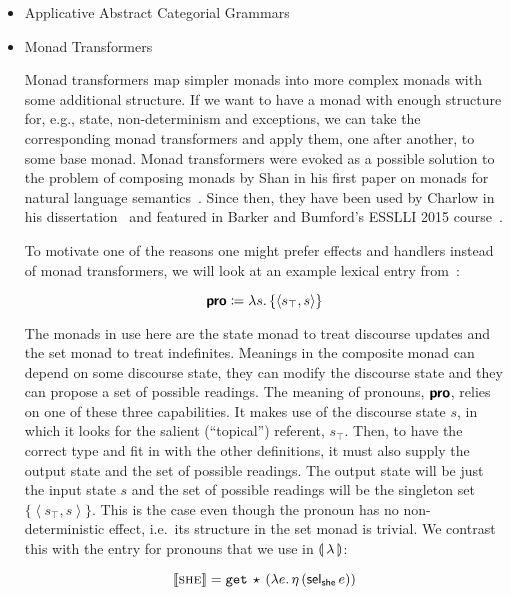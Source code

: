 \begin{itemize}
\item Applicative Abstract Categorial
  Grammars~\cite{kiselyov2015applicative,kiselyov2015swing}

  

  
\item Monad
  Transformers~\cite{charlow2014semantics,barker2015monads}

  Monad transformers map simpler monads into more complex monads with some
  additional structure. If we want to have a monad with enough structure
  for, e.g., state, non-determinism and exceptions, we can take the
  corresponding monad transformers and apply them, one after another, to
  some base monad. Monad transformers were evoked as a possible solution to
  the problem of composing monads by Shan in his first paper on monads for
  natural language semantics~\cite{shan2002monads}. Since then, they have
  been used by Charlow in his dissertation~\cite{charlow2014semantics} and
  featured in Barker and Bumford's ESSLLI 2015
  course~\cite{barker2015monads}.

  To motivate one of the reasons one might prefer effects and handlers
  instead of monad transformers, we will look at an example lexical entry
  from~\cite{charlow2014semantics}:

  $$
  \textsf{\textbf{pro}} \coloneqq \lambda s.\, \{ \left< s_\top, s \right> \}
  $$

  The monads in use here are the state monad to treat discourse updates and
  the set monad to treat indefinites. Meanings in the composite monad can
  depend on some discourse state, they can modify the discourse state and
  they can propose a set of possible readings. The meaning of pronouns,
  $\textsf{\textbf{pro}}$, relies on one of these three capabilities. It
  makes use of the discourse state $s$, in which it looks for the salient
  (``topical'') referent, $s_\top$. Then, to have the correct type and fit
  in with the other definitions, it must also supply the output state and
  the set of possible readings. The output state will be just the input
  state $s$ and the set of possible readings will be the singleton set
  $\{\left< s_\top, s \right>\}$. This is the case even though the pronoun
  has no non-deterministic effect, i.e.\ its structure in the set monad is
  trivial. We contrast this with the entry for pronouns that we use in
  ${\llparenthesis \, \lambda \, \rrparenthesis}$:

  $$
  \llbracket \textsc{she} \rrbracket = \mathtt{get}\,\star\,(\lambda e.\, \eta\,(\textsf{sel}_{\textsf{she}}\,e))
  $$


\end{itemize}
